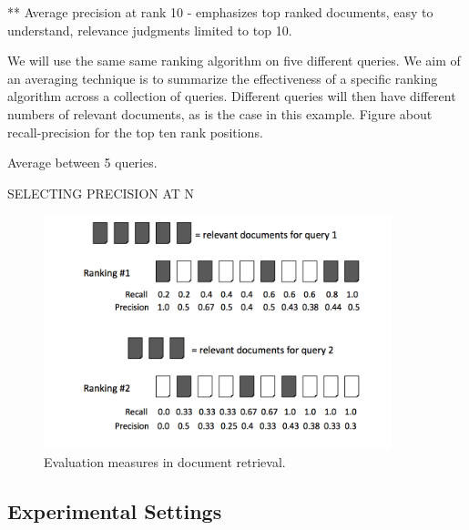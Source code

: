 \documentclass{llncs}
\begin{document}
** Average precision at rank 10 - emphasizes top ranked documents, easy to understand, relevance judgments limited to top 10.

We will use the same same ranking algorithm on five different queries. We aim of an averaging technique is to summarize the effectiveness of a specific ranking algorithm across a collection of queries. Different queries will then have different numbers of relevant documents, as is the case in this example. Figure about recall-precision for the top ten rank positions.

Average between 5 queries.

SELECTING PRECISION AT N


\begin{figure}[h!]
\centering
\includegraphics[width=0.9\textwidth]{figure/cumulativeGain}
\caption{Evaluation measures in document retrieval.}
\label{fig:namedCumulativeGain}%
\end{figure}

\subsection{Experimental Settings}
\label{sec:experimentalSettings}
\end{document}
